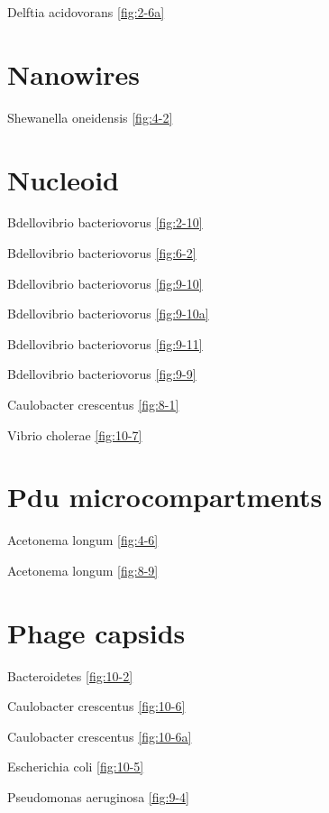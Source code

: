\documentclass[]{tufte-book}
\begin{document}
Delftia acidovorans \ref{fig:2-6a}

\hypertarget{nanowires-1}{%
\section*{Nanowires}\label{nanowires-1}}

Shewanella oneidensis \ref{fig:4-2}

\hypertarget{nucleoid-1}{%
\section*{Nucleoid}\label{nucleoid-1}}

Bdellovibrio bacteriovorus \ref{fig:2-10}

Bdellovibrio bacteriovorus \ref{fig:6-2}

Bdellovibrio bacteriovorus \ref{fig:9-10}

Bdellovibrio bacteriovorus \ref{fig:9-10a}

Bdellovibrio bacteriovorus \ref{fig:9-11}

Bdellovibrio bacteriovorus \ref{fig:9-9}

Caulobacter crescentus \ref{fig:8-1}

Vibrio cholerae \ref{fig:10-7}

\hypertarget{pdu-microcompartments}{%
\section*{Pdu microcompartments}\label{pdu-microcompartments}}

Acetonema longum \ref{fig:4-6}

Acetonema longum \ref{fig:8-9}

\hypertarget{phage-capsids}{%
\section*{Phage capsids}\label{phage-capsids}}

Bacteroidetes \ref{fig:10-2}

Caulobacter crescentus \ref{fig:10-6}

Caulobacter crescentus \ref{fig:10-6a}

Escherichia coli \ref{fig:10-5}

Pseudomonas aeruginosa \ref{fig:9-4}
\end{document}
